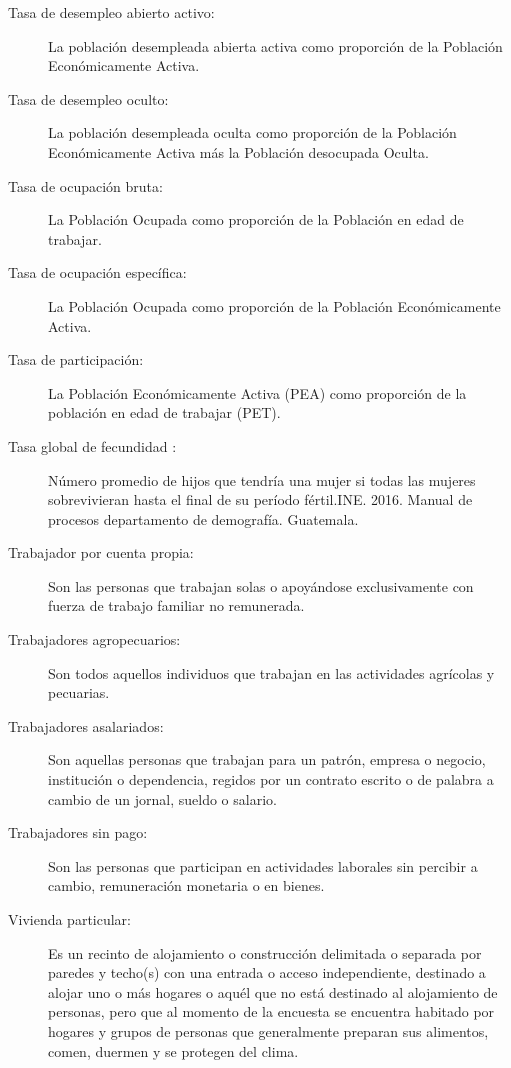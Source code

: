 \begin{description}
	\item[Tasa de desempleo abierto activo:] La población desempleada abierta activa como proporción de la Población Económicamente Activa.
	
	\item[Tasa de desempleo oculto:] La población desempleada oculta como proporción de la Población Económicamente Activa más la Población desocupada Oculta.
		
	\item[Tasa de ocupación bruta:] La Población Ocupada como proporción de la Población en edad de trabajar.
	
	\item[Tasa de ocupación específica:] La Población Ocupada como proporción de la Población Económicamente Activa.
	
	\item[Tasa de participación:] La Población Económicamente Activa (PEA) como proporción de la población en edad de trabajar (PET).
	\item[Tasa global de fecundidad :]Número promedio de hijos que tendría una mujer si todas las mujeres sobrevivieran hasta el final de su período fértil.INE. 2016. Manual de procesos departamento de demografía. Guatemala.
	\item[Trabajador por cuenta propia:] Son las personas que trabajan solas o apoyándose exclusivamente con fuerza de trabajo familiar no remunerada.
	
	\item[Trabajadores agropecuarios:] Son todos aquellos individuos que trabajan en las actividades agrícolas y pecuarias.
	
	\item[Trabajadores asalariados:] Son aquellas personas que trabajan para un patrón, empresa o negocio, institución o dependencia, regidos por un contrato escrito o de palabra a cambio de un jornal, sueldo o salario. 
	
	\item[Trabajadores sin pago:] Son las personas que participan en actividades laborales sin percibir a cambio, remuneración monetaria o en bienes.
	
	\item[Vivienda particular:] Es un recinto de alojamiento o construcción delimitada o separada por paredes y techo(s) con una entrada o acceso independiente, destinado a alojar uno o más hogares o aquél que no está destinado al alojamiento de personas, pero que al momento de la encuesta se encuentra habitado por hogares y grupos de personas que generalmente preparan sus alimentos, comen, duermen y se protegen del clima.
	

\end{description}

